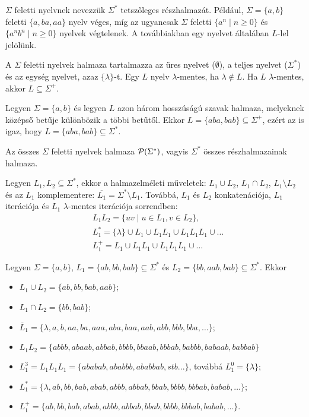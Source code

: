\documentclass[12pt]{report}
\theoremstyle{definition}
\begin{document}
$\Sigma$ feletti nyelvnek nevezzük $\Sigma^*$ tetszőleges részhalmazát. Például, $\Sigma=\{a,b\}$ feletti $\{a,ba,aa\}$ nyelv véges, míg az ugyancsak $\Sigma$ feletti $\{a^n\mid n\geq 0\}$ és $\{a^nb^n\mid n\geq 0\}$ nyelvek végtelenek. A továbbiakban egy  nyelvet általában $L$-lel jelölünk.

\noindent A $\Sigma$ feletti nyelvek halmaza tartalmazza az üres nyelvet ($\emptyset$), a teljes nyelvet ($\Sigma^*$) és az egység nyelvet, azaz $\{\lambda\}$-t. Egy $L$ nyelv $\lambda$-mentes, ha $\lambda\notin L$.  Ha  $L$ $\lambda$-mentes, akkor $L\subseteq\Sigma^+$.

\noindent Legyen $\Sigma=\{a,b\}$ és legyen $L$ azon három hosszúságú szavak halmaza, melyeknek középső betűje különbözik a többi betűtől. Ekkor $L=\{aba,bab\}\subseteq\Sigma^+$, ezért az is igaz, hogy $L=\{aba, bab\}\subseteq\Sigma^*$.

\noindent Az összes $\Sigma$ feletti nyelvek halmaza ${\cal P}(\Sigma^{*})$, vagyis $\Sigma^*$ összes részhalmazainak halmaza. 

Legyen $L_1,L_2\subseteq\Sigma^*$, ekkor a halmazelméleti műveletek: $L_1\cup L_2$, $L_1\cap L_2$, $L_1\setminus L_2$ és az $L_1$ komplementere: $\overline{L_1} = \Sigma^* \setminus L_1$. Továbbá, $L_1$ és $L_2$  konkatenációja, $L_1$ iterációja és $L_1$ $\lambda$-mentes iterációja sorrendben: 
\begin{equation*}
\begin{split}
 &L_1L_2=\{uv\mid u\in L_1, v\in L_2\},\\& 
 L_{1}^{*} = \{\lambda\}\cup L_1\cup L_1L_1\cup L_1L_1L_1\cup\ldots\\&
 L_1^+ = L_1\cup L_1L_1\cup L_1L_1L_1\cup\ldots
\end{split}
\end{equation*}

\noindent Legyen $\Sigma=\{a,b\}$, $L_1=\{ab,bb,bab\}\subseteq\Sigma^*$ és $L_2 = \{bb,aab,bab\}\subseteq\Sigma^*$. Ekkor 
\begin{itemize}
\item $L_1\cup L_2 = \{ab,bb,bab,aab\}$;
\item $L_1\cap L_2 = \{bb,bab\}$;
\item $\overline L_1 = \{\lambda,a,b,aa,ba,aaa,aba,baa,aab,abb,bbb,bba,\ldots\}$;
\item $L_1L_2 = \{abbb,abaab,abbab,bbbb,bbaab,bbbab,babbb,babaab, babbab\}$
\item $L_1^3 = L_1L_1L_1 = \{ababab,ababbb,ababbab,stb...\}$, továbbá $L_1^0 = \{\lambda\}$;
\item $L_1^* = \{\lambda,ab,bb,bab,abab,abbb,abbab,bbab,bbbb,bbbab,babab,\ldots\}$;
\item $L_1^+ = \{ab,bb,bab,abab,abbb,abbab,bbab,bbbb,bbbab,babab,\ldots\}$.
\end{itemize}
\end{document}
